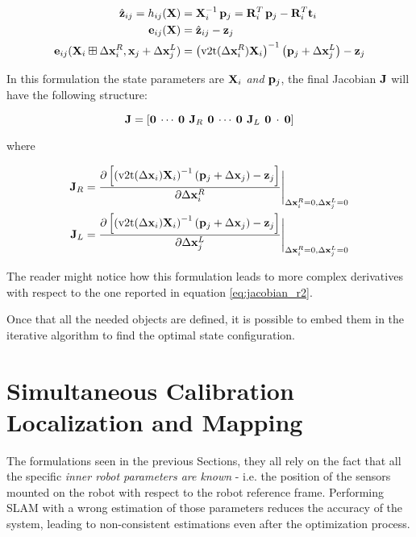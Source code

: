 \begin{align*}
    \pred_{ij} = h_{ij}(\SState) &= \SState_i^{-1} \, \p_j = \rot_{i}^T\,\p_j - \rot_{i}^T\trans_i \\
    \error_{ij}(\SState) &= \pred_{ij} - \meas_j \\
    \error_{ij}(\SState_i \boxplus \dx_i^R, \state_j + \dx_j^L) &= \left(\v2t(\dx_i^R)\SState_i\right)^{-1}\left(\p_j + \dx_j^L\right) - \meas_j
\end{align*}

In this formulation the state parameters are $\mathbf{X}_i$ \textit{and} $\mathbf{p}_j$, the final Jacobian $\mathbf{J}$ will have the following structure:

\begin{equation*}
    \mathbf{J} = \left[\mathbf{0} \: \cdots \: \mathbf{0} \:\, \mathbf{J}_R \,\: \mathbf{0} \: \cdots \: \mathbf{0} \:\, \mathbf{J}_L \,\: \mathbf{0} \: \cdot \: \mathbf{0}\right]
\end{equation*}

\noindent where 

\begin{align}
    \label{eq:jac_p_se2}
    \jacob_R &= \frac{\partial \left[\left(\v2t(\dx_i)\SState_i\right)^{-1}\left(\p_j + \dx_j\right) - \meas_j\right]}{\partial\dx_i^R}\Bigg \rvert_{\dx_i^R = 0, \dx_j^L = 0} \\
    \label{eq:jac_l_se2}
    \jacob_L &= \frac{\partial \left[\left(\v2t(\dx_i)\SState_i\right)^{-1}\left(\p_j + \dx_j\right) - \meas_j\right]}{\partial\dx_j^L}\Bigg \rvert_{\dx_i^R = 0, \dx_j^L = 0}
\end{align}

\noindent The reader might notice how this formulation leads to more complex derivatives with respect to the one reported in equation \ref{eq:jacobian_r2}.

\vspace{10px}

Once that all the needed objects are defined, it is possible to embed them in the iterative algorithm to find the optimal state configuration.

\section{Simultaneous Calibration Localization and Mapping}
The formulations seen in the previous Sections, they all rely on the fact that all the specific \textit{inner robot parameters are known} - i.e. the position of the sensors mounted on the robot with respect to the robot reference frame. Performing SLAM with a wrong estimation of those parameters reduces the accuracy of the system, leading to non-consistent estimations even after the optimization process.

